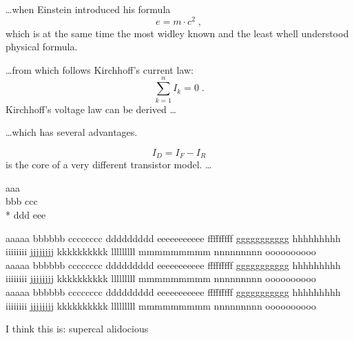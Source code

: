 \documentclass[a4paper, 11pt]{article}
\begin{document}


\ldots when Einstein introduced his formula
\begin{equation}
  e = m \cdot c^2 \; ,
\end{equation}
which is at the same time the most widley known
and the least whell understood physical formula.



\ldots from which follows Kirchhoff's current law:
\begin{equation}
  \sum_{k=1}^{n} I_k = 0 \; .
\end{equation}
Kirchhoff's voltage law can be derived \ldots

\ldots which has several advantages.

\begin{equation}
 I_D = I_F - I_R
\end{equation}
is the core of a very different transistor model. \ldots





aaa
\\
bbb
\newline
ccc
\\*
ddd
\newpage
eee





aaaaa bbbbbb cccccccc ddddddddd eeeeeeeeeee fffffffff ggggggggggg hhhhhhhhh 
iiiiiiii jjjjjjjj kkkkkkkkkk lllllllll mmmmmmmmm nnnnnnnnn oooooooooo\
\\

\sloppy
aaaaa bbbbbb cccccccc ddddddddd eeeeeeeeeee fffffffff ggggggggggg hhhhhhhhh 
iiiiiiii jjjjjjjj kkkkkkkkkk lllllllll mmmmmmmmm nnnnnnnnn oooooooooo
\\

\fussy
aaaaa bbbbbb cccccccc ddddddddd eeeeeeeeeee fffffffff ggggggggggg hhhhhhhhh 
iiiiiiii jjjjjjjj kkkkkkkkkk lllllllll mmmmmmmmm nnnnnnnnn oooooooooo
\\


I think this is: su\-per\-cal\-%
al\-i\-do\-cious
\end{document}
